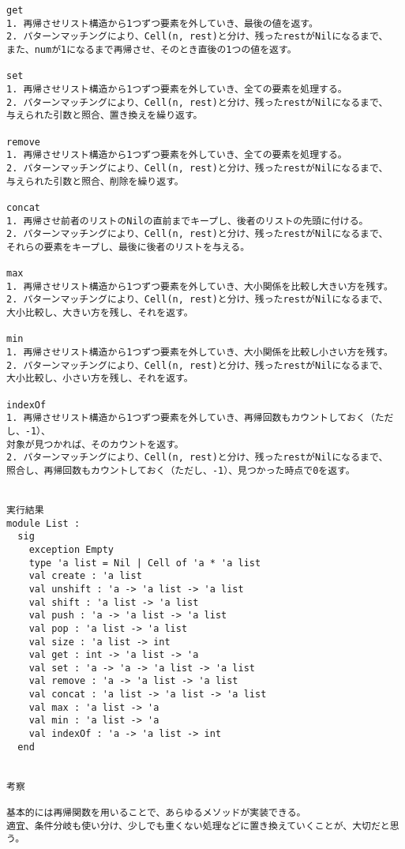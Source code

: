 \documentclass{jarticle}
\begin{document}
\begin{verbatim}
get
1. 再帰させリスト構造から1つずつ要素を外していき、最後の値を返す。
2. パターンマッチングにより、Cell(n, rest)と分け、残ったrestがNilになるまで、
また、numが1になるまで再帰させ、そのとき直後の1つの値を返す。

set
1. 再帰させリスト構造から1つずつ要素を外していき、全ての要素を処理する。
2. パターンマッチングにより、Cell(n, rest)と分け、残ったrestがNilになるまで、
与えられた引数と照合、置き換えを繰り返す。

remove
1. 再帰させリスト構造から1つずつ要素を外していき、全ての要素を処理する。
2. パターンマッチングにより、Cell(n, rest)と分け、残ったrestがNilになるまで、
与えられた引数と照合、削除を繰り返す。

concat
1. 再帰させ前者のリストのNilの直前までキープし、後者のリストの先頭に付ける。
2. パターンマッチングにより、Cell(n, rest)と分け、残ったrestがNilになるまで、
それらの要素をキープし、最後に後者のリストを与える。

max
1. 再帰させリスト構造から1つずつ要素を外していき、大小関係を比較し大きい方を残す。
2. パターンマッチングにより、Cell(n, rest)と分け、残ったrestがNilになるまで、
大小比較し、大きい方を残し、それを返す。

min
1. 再帰させリスト構造から1つずつ要素を外していき、大小関係を比較し小さい方を残す。
2. パターンマッチングにより、Cell(n, rest)と分け、残ったrestがNilになるまで、
大小比較し、小さい方を残し、それを返す。

indexOf
1. 再帰させリスト構造から1つずつ要素を外していき、再帰回数もカウントしておく（ただし、-1）、
対象が見つかれば、そのカウントを返す。
2. パターンマッチングにより、Cell(n, rest)と分け、残ったrestがNilになるまで、
照合し、再帰回数もカウントしておく（ただし、-1）、見つかった時点で0を返す。


実行結果
module List :
  sig
    exception Empty
    type 'a list = Nil | Cell of 'a * 'a list
    val create : 'a list
    val unshift : 'a -> 'a list -> 'a list
    val shift : 'a list -> 'a list
    val push : 'a -> 'a list -> 'a list
    val pop : 'a list -> 'a list
    val size : 'a list -> int
    val get : int -> 'a list -> 'a
    val set : 'a -> 'a -> 'a list -> 'a list
    val remove : 'a -> 'a list -> 'a list
    val concat : 'a list -> 'a list -> 'a list
    val max : 'a list -> 'a
    val min : 'a list -> 'a
    val indexOf : 'a -> 'a list -> int
  end


考察

基本的には再帰関数を用いることで、あらゆるメソッドが実装できる。
適宜、条件分岐も使い分け、少しでも重くない処理などに置き換えていくことが、大切だと思う。

\end{verbatim}
\end{document}
